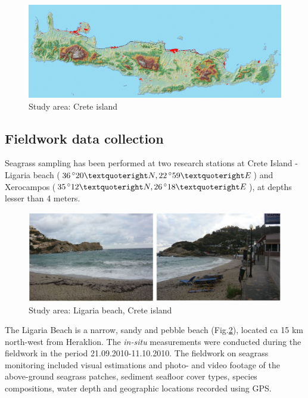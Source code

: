 \documentclass[10pt, a4paper]{article}
\begin{document}
\begin{figure}[h]
	\centering
	\includegraphics[scale=0.10]{Fig-16.jpg}
	\caption{Study area: Crete island}
	\label{fig:3.1}
\end{figure}

\subsection{Fieldwork data collection}
Seagrass sampling has been performed at two research stations at Crete Island - Ligaria beach
($36\,^{\circ}20\textquoteright N, 22\,^{\circ}59\textquoteright E$) and Xerocampos ($35\,^{\circ}12\textquoteright N, 26\,^{\circ}18\textquoteright E$), at depths lesser than 4 meters. 

\begin{figure}[h]
	\centering
	\includegraphics[scale=0.25]{Fig-17.jpg}
	\caption{Study area: Ligaria beach, Crete island}
	\label{fig:3.2}
\end{figure}

The Ligaria Beach is a narrow, sandy and pebble beach (Fig.\ref{fig:3.2}), located ca 15 km north-west from Heraklion.
The \textit{in-situ} measurements were conducted during the fieldwork in the period 21.09.2010-11.10.2010.
The fieldwork on seagrass monitoring included visual estimations and photo- and video footage of the
above-ground seagrass patches, sediment seafloor cover types, species compositions, water depth and
geographic locations recorded using GPS.
\end{document}
